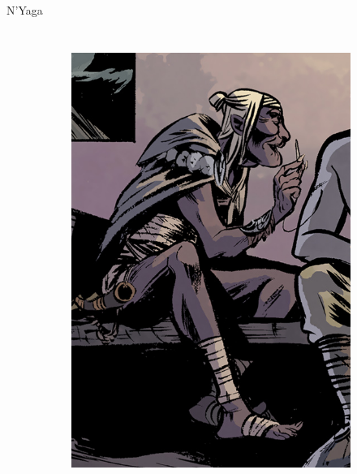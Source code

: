 \begin{frame}{N'Yaga}
\begin{columns}
\begin{figure}[htp]
\begin{subfigure}[b]{0.25\textwidth}
				\includegraphics[width=\textwidth]{img/nyaga/DH}
			\end{subfigure}
			\\
			\begin{subfigure}[b]{0.32\textwidth}

\end{subfigure}
\end{figure}
\end{columns}
\end{frame}

